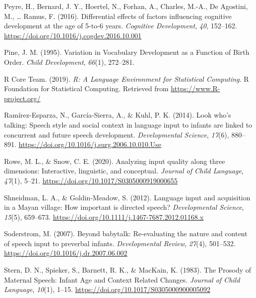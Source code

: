 \documentclass[
  man,floatsintext]{apa6}
\newlength{\cslhangindent}
\newlength{\cslentryspacingunit} %
\newenvironment{CSLReferences}[2] %
 {%
  \setlength{\parindent}{0pt}
  \ifodd #1
  \let\oldpar\par
  \def\par{\hangindent=\cslhangindent\oldpar}
  \fi
  \setlength{\parskip}{#2\cslentryspacingunit}
 }%
 {}
\begin{document}
\begin{CSLReferences}{1}{0}
\leavevmode{}%
Peyre, H., Bernard, J. Y., Hoertel, N., Forhan, A., Charles, M.-A., De Agostini, M., \ldots{} Ramus, F. (2016). Differential effects of factors influencing cognitive development at the age of 5-to-6 years. \emph{Cognitive Development}, \emph{40}, 152--162. \url{https://doi.org/10.1016/j.cogdev.2016.10.001}

\leavevmode{}%
Pine, J. M. (1995). Variation in {Vocabulary} {Development} as a {Function} of {Birth} {Order}. \emph{Child Development}, \emph{66}(1), 272--281.

\leavevmode{}%
R Core Team. (2019). \emph{R: {A} {Language} {Environment} for {Statistical} {Computing}}. R Foundation for Statistical Computing. Retrieved from \url{https://www.R-project.org/}

\leavevmode{}%
Ramírez-Esparza, N., García-Sierra, A., \& Kuhl, P. K. (2014). Look who's talking: Speech style and social context in language input to infants are linked to concurrent and future speech development. \emph{Developmental Science}, \emph{17}(6), 880--891. \url{https://doi.org/10.1016/j.surg.2006.10.010.Use}

\leavevmode{}%
Rowe, M. L., \& Snow, C. E. (2020). Analyzing input quality along three dimensions: Interactive, linguistic, and conceptual. \emph{Journal of Child Language}, \emph{47}(1), 5--21. \url{https://doi.org/10.1017/S0305000919000655}

\leavevmode{}%
Shneidman, L. A., \& Goldin‐Meadow, S. (2012). Language input and acquisition in a {Mayan} village: How important is directed speech? \emph{Developmental Science}, \emph{15}(5), 659--673. \url{https://doi.org/10.1111/j.1467-7687.2012.01168.x}

\leavevmode{}%
Soderstrom, M. (2007). Beyond babytalk: {Re}-evaluating the nature and content of speech input to preverbal infants. \emph{Developmental Review}, \emph{27}(4), 501--532. \url{https://doi.org/10.1016/j.dr.2007.06.002}

\leavevmode{}%
Stern, D. N., Spieker, S., Barnett, R. K., \& MacKain, K. (1983). The {Prosody} of {Maternal} {Speech}: {Infant} {Age} and {Context} {Related} {Changes}. \emph{Journal of Child Language}, \emph{10}(1), 1--15. \url{https://doi.org/10.1017/S0305000900005092}


\end{CSLReferences}
\end{document}
